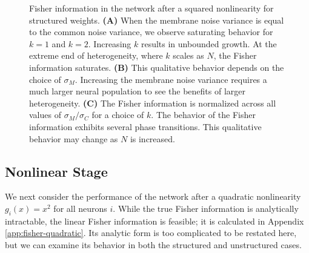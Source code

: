 \documentclass[11pt]{article}
\begin{document}
\begin{figure}[t]
	\centering
	\caption{Fisher information in the network after a squared nonlinearity for structured weights. \textbf{(A)} When the membrane noise variance is equal to the common noise variance, we observe saturating behavior for $k=1$ and $k=2$. Increasing $k$ results in unbounded growth. At the extreme end of heterogeneity, where $k$ scales as $N$, the Fisher information saturates. \textbf{(B)} This qualitative behavior depends on the choice of $\sigma_M$. Increasing the membrane noise variance requires a much larger neural population to see the benefits of larger heterogeneity. \textbf{(C)} The Fisher information is normalized across all values of $\sigma_M/\sigma_C$ for a choice of $k$. The behavior of the Fisher information exhibits several phase transitions. This qualitative behavior may change as $N$ is increased.}
	\label{fig:fisher-quadratic}
\end{figure}
	
	
	\subsection{Nonlinear Stage}
	We next consider the performance of the network after a quadratic nonlinearity $g_i(x) = x^2$ for all neurons $i$. While the true Fisher information is analytically intractable, the linear Fisher information is feasible; it is calculated in Appendix \ref{app:fisher-quadratic}. Its analytic form is too complicated to be restated here, but we can examine its behavior in both the structured and unstructured cases.
	
\end{document}
